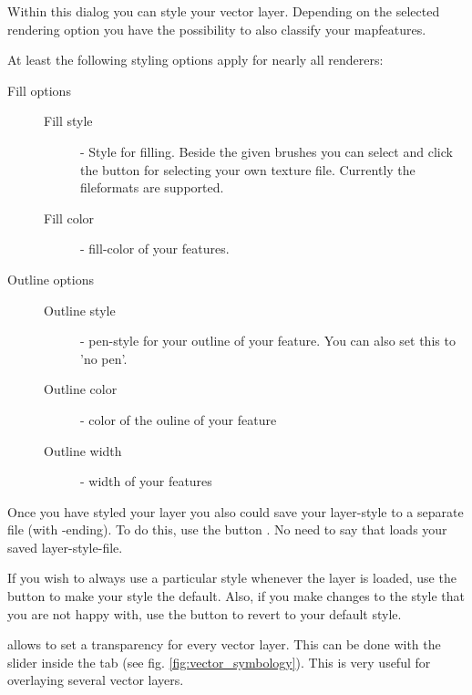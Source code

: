 
 \label{sec:style_options} 
Within this dialog you can style your vector layer. Depending on the selected
rendering option you have the possibility to also classify your mapfeatures.

At least the following styling options apply for nearly all renderers:
\begin{description}
\item[Fill options]
\begin{description}
 \item[Fill style] - Style for filling. Beside the given brushes you can
 select  and click the \browsebutton
 button for selecting your own texture file. Currently the fileformats
  are supported.
 \item[Fill color] - fill-color of your features.
\end{description}
\item[Outline options]
\begin{description}
 \item[Outline style] - pen-style for your outline of your feature. You can
 also set this to 'no pen'.
 \item[Outline color] - color of the ouline of your feature
 \item[Outline width] - width of your features
\end{description}
\end{description}

Once you have styled your layer you also could save your layer-style to a
separate file (with -ending).
To do this, use the button . No need to say that
 loads your saved layer-style-file.

If you wish to always use a particular style whenever the layer is loaded, 
use the  button to make your style the default. Also, 
if you make changes to the style that you are not happy with, use the  button to revert to your default style.

 \label{sec:vect_transparency} 
\qg allows to set a transparency for every vector layer. This can be done with
the slider  inside the  tab (see
fig. \ref{fig:vector_symbology}). This is very useful for overlaying several
vector layers.

